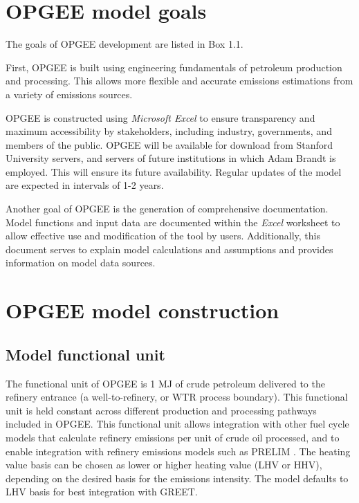 \documentclass[11pt]{report}
\begin{document}
\section{OPGEE model goals}

The goals of OPGEE development are listed in Box 1.1. 

First, OPGEE is built using engineering fundamentals of petroleum production and processing. This allows more flexible and accurate emissions estimations from a variety of emissions sources.

OPGEE is constructed using \emph{Microsoft Excel} to ensure transparency and maximum accessibility by stakeholders, including industry, governments, and members of the public. OPGEE will be available for download from Stanford University servers, and servers of future institutions in which Adam Brandt is employed. This will ensure its future availability. Regular updates of the model are expected in intervals of 1-2 years.

Another goal of OPGEE is the generation of comprehensive documentation. Model functions and input data are documented within the \emph{Excel} worksheet to allow effective use and modification of the tool by users. Additionally, this document serves to explain model calculations and assumptions and provides information on model data sources.




\clearpage

\section{OPGEE model construction}

\subsection{Model functional unit}

The functional unit of OPGEE is 1 MJ of crude petroleum delivered to the refinery entrance (a well-to-refinery, or WTR process boundary). This functional unit is held constant across different production and processing pathways included in OPGEE. This functional unit allows integration with other fuel cycle models that calculate refinery emissions per unit of crude oil processed, and to enable integration with refinery emissions models such as PRELIM \cite{Abella2012}. The heating value basis can be chosen as lower or higher heating value (LHV or HHV), depending on the desired basis for the emissions intensity. The model defaults to LHV basis for best integration with GREET.
\end{document}

